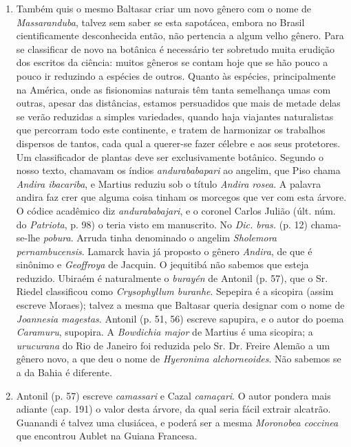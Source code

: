 \begin{enumerate}
\item Também quis o mesmo Baltasar criar um novo gênero com o nome de \textit{Massaranduba}, 
talvez sem saber se esta sapotácea, embora no Brasil cientificamente 
desconhecida então, não pertencia a algum velho gênero. Para se classificar de novo 
na botânica é necessário ter sobretudo muita erudição dos escritos da ciência: muitos 
gêneros se contam hoje que se hão pouco a pouco ir reduzindo a espécies de outros. 
Quanto às espécies, principalmente na América, onde as fisionomias naturais têm tanta 
semelhança umas com outras, apesar das distâncias, estamos persuadidos que mais de 
metade delas se verão reduzidas a simples variedades, quando haja viajantes 
naturalistas que percorram todo este continente, e tratem de harmonizar os trabalhos 
dispersos de tantos, cada qual a querer-se fazer célebre e aos seus protetores.  Um 
classificador de plantas deve ser exclusivamente botânico.
Segundo o nosso texto, chamavam os índios \textit{andurababapari} ao angelim, que Piso 
chama \textit{Andira ibacariba}, e Martius reduziu sob o título \textit{Andira rosea}. A palavra andira faz 
crer que alguma coisa tinham os morcegos que ver com esta árvore.
O códice acadêmico diz \textit{andurababajari}, e o coronel Carlos Julião (últ. núm. do \textit{Patriota}, p. 98) 
o teria visto em manuscrito. No \textit{Dic. bras.} (p. 12) chama-se-lhe \textit{pobura}. 
Arruda tinha denominado o angelim \textit{Sholemora pernambucensis}. Lamarck havia já proposto 
o gênero \textit{Andira}, de que é sinônimo e \textit{Geoffroya} de Jacquin. O jequitibá não 
sabemos que esteja reduzido. Ubiraém é naturalmente o \textit{burayén} de 
Antonil (p. 57), que o Sr. Riedel classificou como \textit{Crysophyllum buranhe}. Sepepira é a 
sicopira (assim escreve Moraes); talvez a mesma que Baltasar queria designar com o nome 
de \textit{Joannesia magestas}. Antonil (p. 51, 56) escreve sapupira, e o autor do poema  
\textit{Caramuru}, supopira. A \textit{Bowdichia major} de Martius é uma sicopira; a \textit{urucurana} do Rio de 
Janeiro foi reduzida pelo Sr. Dr. Freire Alemão a um gênero novo, a que deu o nome de 
\textit{Hyeronima alchorneoides}. Não sabemos se a da Bahia é diferente.

\item  Antonil (p. 57) escreve \textit{camassari} e Cazal \textit{camaçari}. O autor pondera mais 
adiante (cap. 191) o valor desta árvore, da qual seria fácil extrair alcatrão. Guanandi é 
talvez uma clusiácea, e poderá ser a mesma \textit{Moronobea coccinea} que encontrou Aublet 
na Guiana Francesa.


\end{enumerate}
